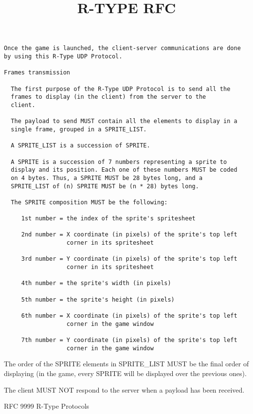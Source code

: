 \documentclass[12pt, letterpaper]{article}\title{R-TYPE RFC}
\begin{document}
\begin{verbatim}
Once the game is launched, the client-server communications are done
by using this R-Type UDP Protocol.

Frames transmission

  The first purpose of the R-Type UDP Protocol is to send all the
  frames to display (in the client) from the server to the
  client.

  The payload to send MUST contain all the elements to display in a
  single frame, grouped in a SPRITE_LIST.

  A SPRITE_LIST is a succession of SPRITE.

  A SPRITE is a succession of 7 numbers representing a sprite to
  display and its position. Each one of these numbers MUST be coded
  on 4 bytes. Thus, a SPRITE MUST be 28 bytes long, and a
  SPRITE_LIST of (n) SPRITE MUST be (n * 28) bytes long.

  The SPRITE composition MUST be the following:

     1st number = the index of the sprite's spritesheet

     2nd number = X coordinate (in pixels) of the sprite's top left
                  corner in its spritesheet

     3rd number = Y coordinate (in pixels) of the sprite's top left
                  corner in its spritesheet

     4th number = the sprite's width (in pixels)

     5th number = the sprite's height (in pixels)

     6th number = X coordinate (in pixels) of the sprite's top left
                  corner in the game window

     7th number = Y coordinate (in pixels) of the sprite's top left
                  corner in the game window
\end{verbatim}

The order of the SPRITE elements in SPRITE\_LIST MUST be the final order
of displaying (in the game, every SPRITE will be displayed over the
previous ones).

The client MUST NOT respond to the server when a payload has been
received.

RFC 9999 R-Type Protocols
\end{document}
